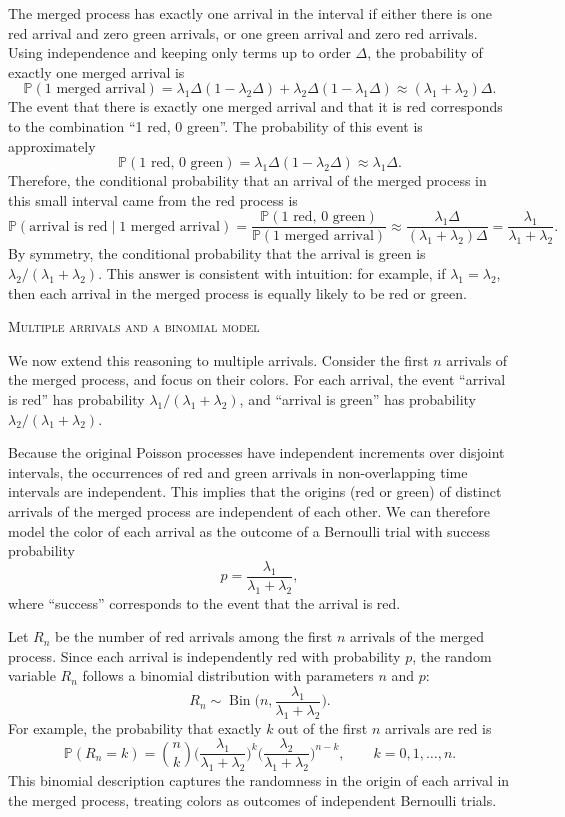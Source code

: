 The merged process has exactly one arrival in the interval if either there is one red arrival and zero green arrivals, or one green arrival and zero red arrivals.  
Using independence and keeping only terms up to order \(\Delta\), the probability of exactly one merged arrival is
\[
\mathbb{P}(\text{1 merged arrival})
=
\lambda_1 \Delta (1 - \lambda_2 \Delta)
+
\lambda_2 \Delta (1 - \lambda_1 \Delta)
\approx
(\lambda_1 + \lambda_2)\Delta.
\]
The event that there is exactly one merged arrival and that it is red corresponds to the combination “1 red, 0 green”.  
The probability of this event is approximately
\[
\mathbb{P}(\text{1 red, 0 green})
=
\lambda_1 \Delta (1 - \lambda_2 \Delta)
\approx
\lambda_1 \Delta.
\]
Therefore, the conditional probability that an arrival of the merged process in this small interval came from the red process is
\[
\mathbb{P}(\text{arrival is red} \mid \text{1 merged arrival})
=
\frac{\mathbb{P}(\text{1 red, 0 green})}{\mathbb{P}(\text{1 merged arrival})}
\approx
\frac{\lambda_1 \Delta}{(\lambda_1 + \lambda_2)\Delta}
=
\frac{\lambda_1}{\lambda_1 + \lambda_2}.
\]
By symmetry, the conditional probability that the arrival is green is \(\lambda_2 / (\lambda_1 + \lambda_2)\).  
This answer is consistent with intuition: for example, if \(\lambda_1 = \lambda_2\), then each arrival in the merged process is equally likely to be red or green.

\bigskip
\textsc{Multiple arrivals and a binomial model}

We now extend this reasoning to multiple arrivals.  
Consider the first \(n\) arrivals of the merged process, and focus on their colors.  
For each arrival, the event “arrival is red” has probability \(\lambda_1 / (\lambda_1 + \lambda_2)\), and “arrival is green” has probability \(\lambda_2 / (\lambda_1 + \lambda_2)\).  

Because the original Poisson processes have independent increments over disjoint intervals, the occurrences of red and green arrivals in non-overlapping time intervals are independent.  
This implies that the origins (red or green) of distinct arrivals of the merged process are independent of each other.  
We can therefore model the color of each arrival as the outcome of a Bernoulli trial with success probability
\[
p = \frac{\lambda_1}{\lambda_1 + \lambda_2},
\]
where “success” corresponds to the event that the arrival is red.  

Let \(R_n\) be the number of red arrivals among the first \(n\) arrivals of the merged process.  
Since each arrival is independently red with probability \(p\), the random variable \(R_n\) follows a binomial distribution with parameters \(n\) and \(p\):
\[
R_n \sim \operatorname{Bin}\Big(n, \frac{\lambda_1}{\lambda_1 + \lambda_2}\Big).
\]
For example, the probability that exactly \(k\) out of the first \(n\) arrivals are red is
\[
\mathbb{P}(R_n = k)
=
\binom{n}{k}
\Big(\frac{\lambda_1}{\lambda_1 + \lambda_2}\Big)^{k}
\Big(\frac{\lambda_2}{\lambda_1 + \lambda_2}\Big)^{n-k},
\qquad k = 0, 1, \dots, n.
\]
This binomial description captures the randomness in the origin of each arrival in the merged process, treating colors as outcomes of independent Bernoulli trials.

